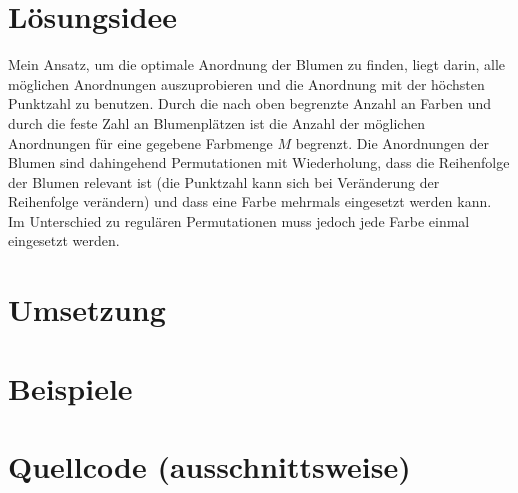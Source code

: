 \documentclass[a4paper,10pt,ngerman]{scrartcl}
\title{\Aufgabe}
\author{\Name\\Einsendenummer: \Einsendenummer}
\date{\today}
\begin{document}
\maketitle
\tableofcontents

\section{Lösungsidee}
Mein Ansatz, um die optimale Anordnung der Blumen zu finden, liegt darin, alle möglichen Anordnungen auszuprobieren und die Anordnung mit der höchsten Punktzahl zu benutzen.
Durch die nach oben begrenzte Anzahl an Farben und durch die feste Zahl an Blumenplätzen ist die Anzahl der möglichen Anordnungen für eine gegebene Farbmenge $M$ begrenzt.
Die Anordnungen der Blumen sind dahingehend Permutationen mit Wiederholung, dass die Reihenfolge der Blumen relevant ist (die Punktzahl kann sich bei Veränderung der Reihenfolge verändern) und dass eine Farbe mehrmals eingesetzt werden kann.
Im Unterschied zu regulären Permutationen muss jedoch jede Farbe einmal eingesetzt werden.

\section{Umsetzung}

\section{Beispiele}

\section{Quellcode (ausschnittsweise)}
\end{document}
